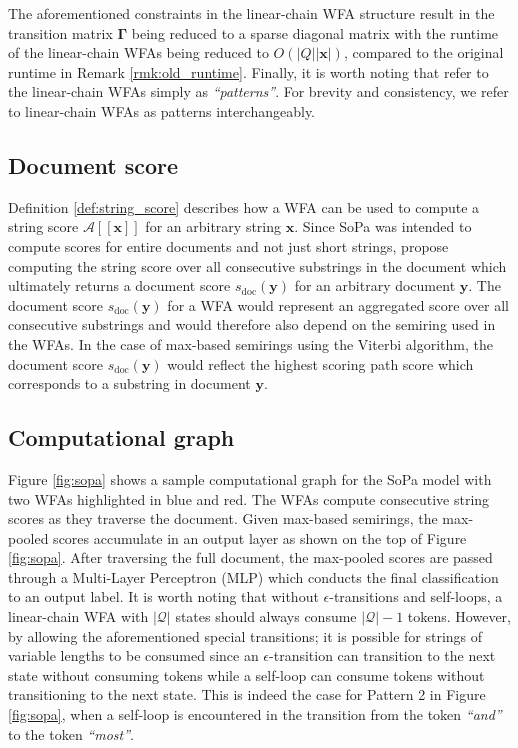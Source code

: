 The aforementioned constraints in the linear-chain WFA structure result in the
transition matrix $\bm{\Gamma}$ being reduced to a sparse diagonal matrix with the
runtime of the linear-chain WFAs being reduced to $O(|Q||\bm{x}|)$, compared to
the original runtime in Remark \ref{rmk:old_runtime}. Finally, it is worth
noting that \citet[Page 3, Section 3.1]{schwartz2018sopa} refer to the
linear-chain WFAs simply as \textit{``patterns''}. For brevity and consistency,
we refer to linear-chain WFAs as patterns interchangeably.

\subsection{Document score}

\label{section:sopa_doc_score}

Definition \ref{def:string_score} describes how a WFA can be used to compute a
string score $\mathcal{A}[\![\bm{x}]\!]$ for an arbitrary string $\bm{x}$. Since
SoPa was intended to compute scores for entire documents and not just short
strings, \citet[Page 3, Section 3.2]{schwartz2018sopa} propose computing the
string score over all consecutive substrings in the document which ultimately
returns a document score $s_{\text{doc}}(\bm{y})$ for an arbitrary document
$\bm{y}$. The document score $s_{\text{doc}}(\bm{y})$ for a WFA would represent
an aggregated score over all consecutive substrings and would therefore also
depend on the semiring used in the WFAs. In the case of max-based semirings
using the Viterbi algorithm, the document score $s_{\text{doc}}(\bm{y})$ would
reflect the highest scoring path score which corresponds to a substring in
document $\bm{y}$.

\subsection{Computational graph}

\label{section:sopa_cg}

Figure \ref{fig:sopa} shows a sample
computational graph for the SoPa model with two WFAs highlighted in blue and
red. The WFAs compute consecutive string scores as they traverse the document.
Given max-based semirings, the max-pooled scores accumulate in an output layer
as shown on the top of Figure \ref{fig:sopa}. After traversing the full
document, the max-pooled scores are passed through a Multi-Layer Perceptron
(MLP) which conducts the final classification to an output label. It is worth
noting that without $\epsilon$-transitions and self-loops, a linear-chain WFA
with $|\mathcal{Q}|$ states should always consume $\mathcal{|Q|}-1$ tokens.
However, by allowing the aforementioned special transitions; it is possible for
strings of variable lengths to be consumed since an $\epsilon$-transition can
transition to the next state without consuming tokens while a self-loop can
consume tokens without transitioning to the next state. This is indeed the case
for Pattern 2 in Figure \ref{fig:sopa}, when a self-loop is encountered in the
transition from the token \textit{``and''} to the token \textit{``most''}.

